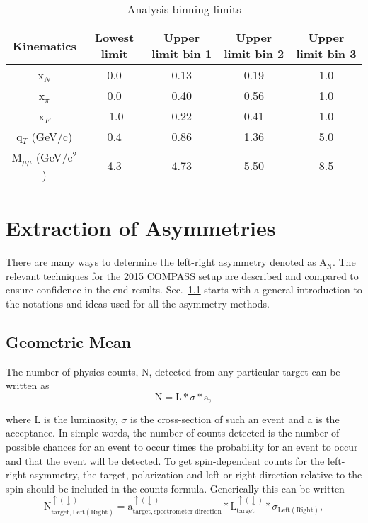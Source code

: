 \begin{table}[h!t]
  \centering
  \begin{tabular}{ |c|c|c|c|c| }
    \hline \textbf{Kinematics}& \textbf{Lowest limit}& \textbf{Upper limit bin
      1}& \textbf{Upper limit bin 2}& \textbf{Upper limit bin 3}\\ \hline
    
    x$_N$& 0.0& 0.13& 0.19& 1.0\\ \hline x$_{\pi}$& 0.0& 0.40& 0.56&
    1.0\\ \hline x$_F$& -1.0& 0.22& 0.41& 1.0\\ \hline q$_T$ (GeV/c)& 0.4& 0.86&
    1.36& 5.0\\ \hline M$_{\mu\mu}$ (GeV/c$^2$)& 4.3& 4.73& 5.50& 8.5 \\ \hline
    
  \end{tabular}
  \caption{Analysis binning limits}
  \label{tab::binning}
\end{table}


\section{Extraction of Asymmetries} 
There are many ways to determine the left-right asymmetry denoted as
A$_{\mathrm{N}}$.  The relevant techniques for the 2015 COMPASS setup are
described and compared to ensure confidence in the end results.
Sec.~\ref{sec::GeoMean} starts with a general introduction to the notations and
ideas used for all the asymmetry methods.

\subsection{Geometric Mean} \label{sec::GeoMean}
The number of physics counts, N, detected from any particular target can be
written as
\begin{equation}
  \mathrm{N} = \mathrm{L} * \sigma * \mathrm{a},
\end{equation}

\noindent
where L is the luminosity, $\sigma$ is the cross-section of such an
event and a is the acceptance.  In simple words, the number of counts detected
is the number of possible chances for an event to occur times the probability
for an event to occur and that the event will be detected.  To get
spin-dependent counts for the left-right asymmetry, the target, polarization
and left or right direction relative to the spin should be included in the
counts formula.  Generically this can be written
\begin{equation}
  \label{eqn::indexedCount}
  \mathrm{N}^{\uparrow(\downarrow)}_{\mathrm{target},\mathrm{Left(Right)}} =
  \mathrm{a}^{\uparrow(\downarrow)}_{\mathrm{target},\mathrm{spectrometer \;
      direction}} * \mathrm{L}^{\uparrow(\downarrow)}_{\mathrm{target}} *
  \sigma_{\mathrm{Left(Right)}},
\end{equation}

